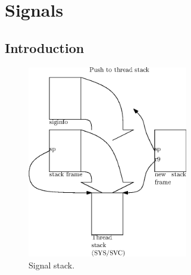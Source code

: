 \part{Signals}

\chapter{Introduction}

\begin{figure}
  \center
  \includegraphics[width=7cm]{pics/signal_stack}
  \caption{Signal stack.}
  \label{figure:sigstack}
\end{figure}
